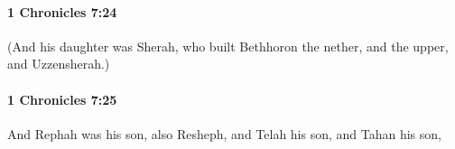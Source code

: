 		\paragraph{1 Chronicles 7:24} %
			\label{1CHRONICLES-7-24}

			(And his daughter was Sherah, who built Bethhoron the nether, and the upper, and Uzzensherah.)


		\paragraph{1 Chronicles 7:25} %
			\label{1CHRONICLES-7-25}

			And Rephah was his son, also Resheph, and Telah his son, and Tahan his son,


